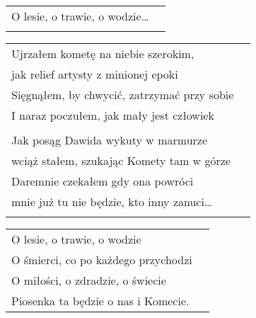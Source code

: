 \documentclass[a5paper]{article}
\begin{document}
\noindent
\begin{tabular}{@{}p{9.50cm}p{3cm}@{}}
O lesie, o trawie, o wodzie… \\ \\
\end{tabular}

\noindent
\begin{tabular}{@{}p{9.50cm}p{3cm}@{}}
Ujrzałem kometę na niebie szerokim, \\
jak relief artysty z minionej epoki \\
Sięgnąłem, by chwycić, zatrzymać przy sobie \\
I naraz poczułem, jak mały jest człowiek \\ \\
 
Jak posąg Dawida wykuty w marmurze \\
wciąż stałem, szukając Komety tam w górze \\
Daremnie czekałem gdy ona powróci \\
mnie już tu nie będzie, kto inny zanuci… \\ \\
\end{tabular}

\begin{tabular}{@{}p{9.50cm}p{3cm}@{}}
\noindent
O lesie, o trawie, o wodzie \\
O śmierci, co po każdego przychodzi \\
O miłości, o zdradzie, o świecie \\
Piosenka ta będzie o nas i Komecie.
\end{tabular}
\end{document}
